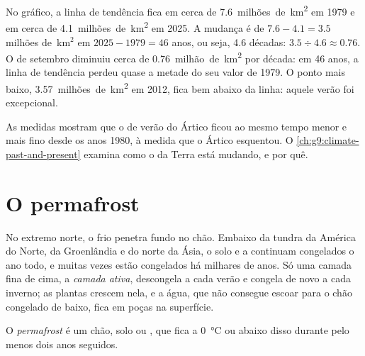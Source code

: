 \begin{example}
No gráfico, a linha de tendência fica em cerca de \num{7.6}~milhões~de~\unit{km^2} em 1979
e em cerca de \num{4.1}~milhões~de~\unit{km^2} em 2025. A mudança é de $7.6 - 4.1 =
3.5$ milhões de~km$^2$ em $2025 - 1979 = 46$ anos, ou seja, 4.6 décadas:
$3.5 \div 4.6 \approx 0.76$. O  de setembro diminuiu cerca de
\num{0.76}~milhão~de~\unit{km^2} por década: em 46 anos, a linha de tendência
perdeu quase a metade do seu valor de 1979. O
ponto mais baixo, \num{3.57}~milhões~de~\unit{km^2} em 2012, fica bem abaixo da linha:
aquele verão foi excepcional.
\end{example}

As medidas mostram que o  de verão do Ártico ficou ao mesmo
tempo menor e mais fino desde os anos 1980, à medida que o Ártico
esquentou. O \cref{ch:g9:climate-past-and-present} examina como o  da
Terra está mudando, e por quê.

\section{O permafrost}

No extremo norte, o frio penetra fundo no chão. Embaixo da tundra da
América do Norte, da Groenlândia e do norte da Ásia, o solo e a 
continuam congelados o ano todo, e muitas vezes estão congelados há
milhares de anos. Só uma camada fina de cima, a \emph{camada
ativa}, descongela a cada verão e congela de novo a cada inverno; as
plantas crescem nela, e a água, que não consegue escoar para o chão
congelado de baixo, fica em poças na superfície.

\begin{definition}[Permafrost]\label{def:g8:ice-on-earth:permafrost}
O \emph{permafrost} é um chão, solo ou , que fica a
\qty{0}{\degreeCelsius} ou abaixo disso durante pelo menos dois anos seguidos.
\end{definition}

